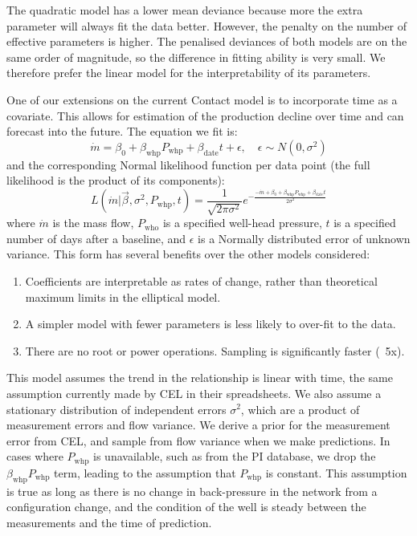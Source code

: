 \documentclass[a4paper, 12pt]{article}
\newlength{\drop}
\begin{document}
The quadratic model has a lower mean deviance because more the extra parameter will always fit the data better. However, the penalty on the number of effective parameters is higher. The penalised deviances of both models are on the same order of magnitude, so the difference in fitting ability is very small. We therefore prefer the linear model for the interpretability of its parameters.

One of our extensions on the current Contact model is to incorporate time as a covariate. This allows for estimation of the production decline over time and can forecast into the future. The equation we fit is:
\begin{equation} \label{eq:linreg}
\dot{m} = \beta_0 + \beta_\text{whp}P_\text{whp} + \beta_\text{date}t + \epsilon,\quad \epsilon\sim N(0, \sigma^2)
\end{equation}
and the corresponding Normal likelihood function per data point (the full likelihood is the product of its components):
\begin{equation}
L\left( \dot{m} | \vec{\beta},\sigma^2,P_\text{whp},t \right) = \frac{1}{\sqrt{2\pi\sigma^2}} e^{-\frac{-\dot{m} + \beta_0 + \beta_\text{whp}P_\text{whp} + \beta_\text{date}t}{2\sigma^2}}
\end{equation}
where $\dot{m}$ is the mass flow, $P_\text{who}$ is a specified well-head pressure, $t$ is a specified number of days after a baseline, and $\epsilon$ is a Normally distributed error of unknown variance. This form has several benefits over the other models considered:

\begin{enumerate}
\item Coefficients are interpretable as rates of change, rather than theoretical maximum limits in the elliptical model.
\item A simpler model with fewer parameters is less likely to over-fit to the data.
\item There are no root or power operations. Sampling is significantly faster (~5x).
\end{enumerate}

This model assumes the trend in the relationship is linear with time, the same assumption currently made by CEL in their spreadsheets. We also assume a stationary distribution of independent errors $\sigma^2$, which are a product of measurement errors and flow variance. We derive a prior for the measurement error from CEL, and sample from flow variance when we make predictions. In cases where $P_\text{whp}$ is unavailable, such as from the PI database, we drop the $\beta_\text{whp}P_\text{whp}$ term, leading to the assumption that $P_\text{whp}$ is constant. This assumption is true as long as there is no change in back-pressure in the network from a configuration change, and the condition of the well is steady between the measurements and the time of prediction.
\end{document}
